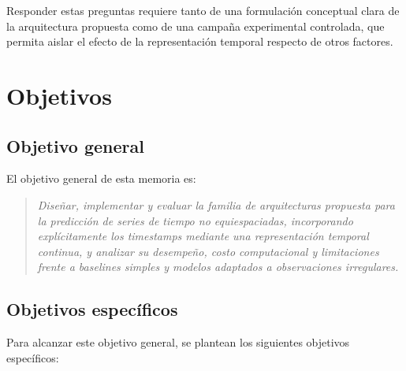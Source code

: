 Responder estas preguntas requiere tanto de una formulación conceptual clara de la arquitectura propuesta como de una campaña experimental controlada, que permita aislar el efecto de la representación temporal respecto de otros factores.

\section{Objetivos}

\subsection{Objetivo general}

El objetivo general de esta memoria es:

\begin{quote}
    \textit{Diseñar, implementar y evaluar la familia de arquitecturas propuesta para la predicción de series de tiempo no equiespaciadas, incorporando explícitamente los timestamps mediante una representación temporal continua, y analizar su desempeño, costo computacional y limitaciones frente a baselines simples y modelos adaptados a observaciones irregulares.}
\end{quote}

\subsection{Objetivos específicos}

Para alcanzar este objetivo general, se plantean los siguientes objetivos específicos:

